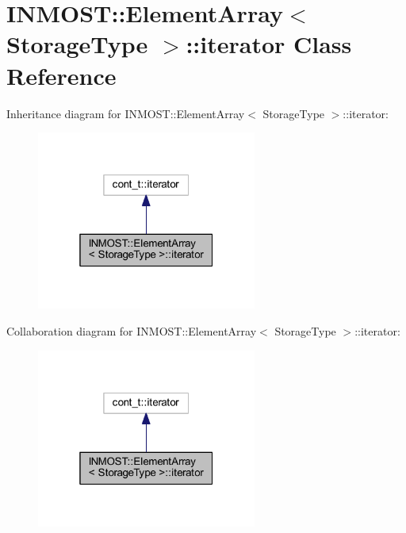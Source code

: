 \hypertarget{classINMOST_1_1ElementArray_1_1iterator}{\section{I\-N\-M\-O\-S\-T\-:\-:Element\-Array$<$ Storage\-Type $>$\-:\-:iterator Class Reference}
\label{classINMOST_1_1ElementArray_1_1iterator}
}


Inheritance diagram for I\-N\-M\-O\-S\-T\-:\-:Element\-Array$<$ Storage\-Type $>$\-:\-:iterator\-:\nopagebreak
\begin{figure}[H]
\begin{center}
\leavevmode
\includegraphics[width=205pt]{classINMOST_1_1ElementArray_1_1iterator__inherit__graph}
\end{center}
\end{figure}


Collaboration diagram for I\-N\-M\-O\-S\-T\-:\-:Element\-Array$<$ Storage\-Type $>$\-:\-:iterator\-:\nopagebreak
\begin{figure}[H]
\begin{center}
\leavevmode
\includegraphics[width=205pt]{classINMOST_1_1ElementArray_1_1iterator__coll__graph}
\end{center}
\end{figure}
